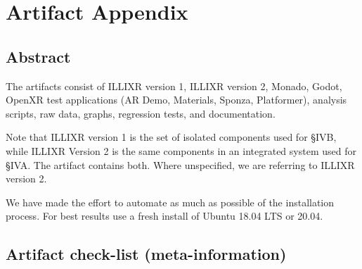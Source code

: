 \documentclass{sigplanconf}
\begin{document}


\appendix
\section{Artifact Appendix}

\subsection{Abstract}

The artifacts consist of ILLIXR version 1, ILLIXR version 2, Monado, Godot, OpenXR test applications (AR Demo, Materials, Sponza, Platformer), analysis scripts, raw data, graphs, regression tests, and documentation.

Note that ILLIXR version 1 is the set of isolated components used for \S IVB, while ILLIXR Version 2 is the same components in an integrated system used for \S IVA. The artifact contains both. Where unspecified, we are referring to ILLIXR version 2.

We have made the effort to automate as much as possible of the installation process. For best results use a fresh install of Ubuntu 18.04 LTS or 20.04.

\subsection{Artifact check-list (meta-information)}
\end{document}
